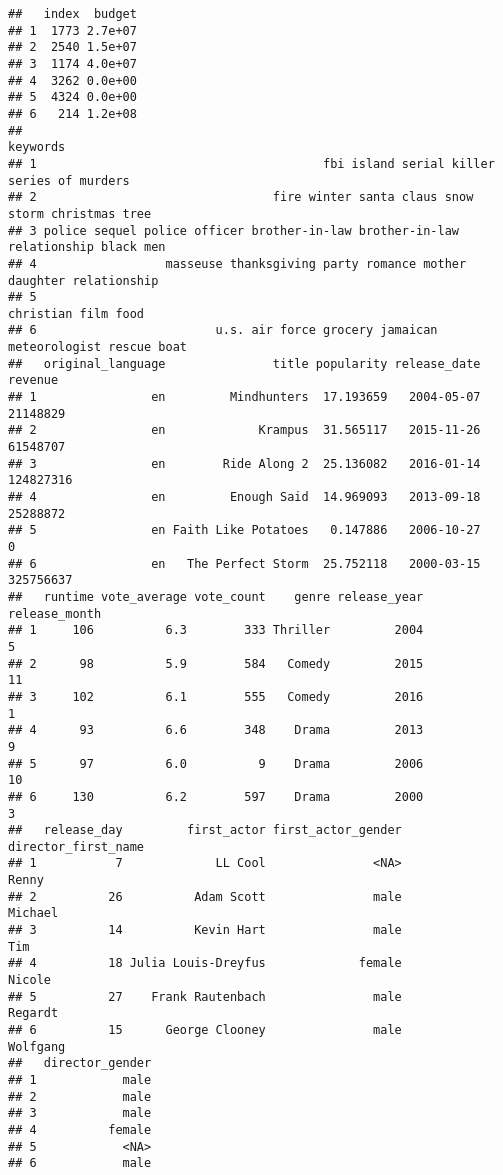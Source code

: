 \documentclass[
]{article}
\begin{document}
\begin{verbatim}
##   index  budget
## 1  1773 2.7e+07
## 2  2540 1.5e+07
## 3  1174 4.0e+07
## 4  3262 0.0e+00
## 5  4324 0.0e+00
## 6   214 1.2e+08
##                                                                            keywords
## 1                                        fbi island serial killer series of murders
## 2                                 fire winter santa claus snow storm christmas tree
## 3 police sequel police officer brother-in-law brother-in-law relationship black men
## 4                  masseuse thanksgiving party romance mother daughter relationship
## 5                                                               christian film food
## 6                         u.s. air force grocery jamaican meteorologist rescue boat
##   original_language               title popularity release_date   revenue
## 1                en         Mindhunters  17.193659   2004-05-07  21148829
## 2                en             Krampus  31.565117   2015-11-26  61548707
## 3                en        Ride Along 2  25.136082   2016-01-14 124827316
## 4                en         Enough Said  14.969093   2013-09-18  25288872
## 5                en Faith Like Potatoes   0.147886   2006-10-27         0
## 6                en   The Perfect Storm  25.752118   2000-03-15 325756637
##   runtime vote_average vote_count    genre release_year release_month
## 1     106          6.3        333 Thriller         2004             5
## 2      98          5.9        584   Comedy         2015            11
## 3     102          6.1        555   Comedy         2016             1
## 4      93          6.6        348    Drama         2013             9
## 5      97          6.0          9    Drama         2006            10
## 6     130          6.2        597    Drama         2000             3
##   release_day         first_actor first_actor_gender director_first_name
## 1           7             LL Cool               <NA>               Renny
## 2          26          Adam Scott               male             Michael
## 3          14          Kevin Hart               male                 Tim
## 4          18 Julia Louis-Dreyfus             female              Nicole
## 5          27    Frank Rautenbach               male             Regardt
## 6          15      George Clooney               male            Wolfgang
##   director_gender
## 1            male
## 2            male
## 3            male
## 4          female
## 5            <NA>
## 6            male
\end{verbatim}
\end{document}
